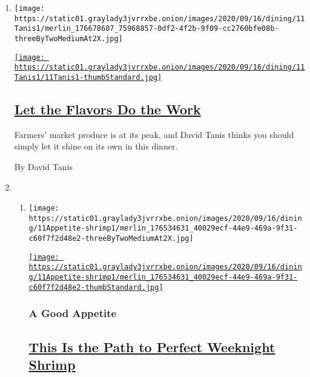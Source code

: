\begin{enumerate}
\def\labelenumi{\arabic{enumi}.}
\item
  \texttt{[image: https://static01.graylady3jvrrxbe.onion/images/2020/09/16/dining/11Tanis1/merlin\_176678607\_75968857-0df2-4f2b-9f09-cc2760bfe08b-threeByTwoMediumAt2X.jpg]}

  \href{/2020/09/11/dining/harvest-dinner-menu.html}{\texttt{[image: https://static01.graylady3jvrrxbe.onion/images/2020/09/16/dining/11Tanis1/11Tanis1-thumbStandard.jpg]}}

  \hypertarget{let-the-flavors-do-the-work}{%
  \subsection{\texorpdfstring{\href{/2020/09/11/dining/harvest-dinner-menu.html}{Let
  the Flavors Do the
  Work}}{Let the Flavors Do the Work}}\label{let-the-flavors-do-the-work}}

  Farmers' market produce is at its peak, and David Tanis thinks you
  should simply let it shine on its own in this dinner.

  By David Tanis
\item
  \begin{enumerate}
  \def\labelenumii{\arabic{enumii}.}
  \item
    \texttt{[image: https://static01.graylady3jvrrxbe.onion/images/2020/09/16/dining/11Appetite-shrimp1/merlin\_176534631\_40029ecf-44e9-469a-9f31-c60f7f2d48e2-threeByTwoMediumAt2X.jpg]}

    \href{/2020/09/11/dining/shrimp-scampi-recipe.html}{\texttt{[image: https://static01.graylady3jvrrxbe.onion/images/2020/09/16/dining/11Appetite-shrimp1/merlin\_176534631\_40029ecf-44e9-469a-9f31-c60f7f2d48e2-thumbStandard.jpg]}}

    \hypertarget{a-good-appetite}{%
    \subsubsection{A Good Appetite}\label{a-good-appetite}}

    \hypertarget{this-is-the-path-to-perfect-weeknight-shrimp}{%
    \subsection{\texorpdfstring{\href{/2020/09/11/dining/shrimp-scampi-recipe.html}{This
    Is the Path to Perfect Weeknight
    Shrimp}}{This Is the Path to Perfect Weeknight Shrimp}}\label{this-is-the-path-to-perfect-weeknight-shrimp}}


\end{enumerate}
\end{enumerate}
